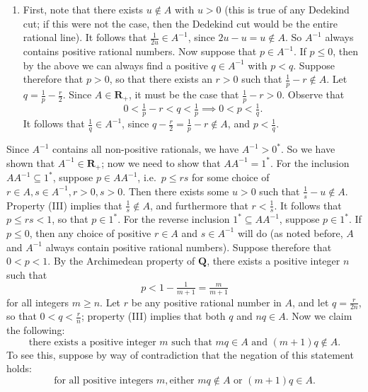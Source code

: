 \documentclass[12pt]{article}
\newcommand{\Q}{\mathbf{Q}}
\newcommand{\R}{\mathbf{R}}
\theoremstyle{definition}
\begin{document}
\begin{enumerate}[label = (M\arabic*)]
\begin{enumerate}[label = (\Roman*)]
        \item First, note that there exists \( u \not\in A \) with \( u > 0 \) (this is true of any Dedekind cut; if this were not the case, then the Dedekind cut would be the entire rational line). It follows that \( \tfrac{1}{2u} \in A^{-1} \), since \( 2u - u = u \not\in A \). So \( A^{-1} \) always contains positive rational numbers. Now suppose that \( p \in A^{-1} \). If \( p \leq 0 \), then by the above we can always find a positive \( q \in A^{-1} \) with \( p < q \). Suppose therefore that \( p > 0 \), so that there exists an \( r > 0 \) such that \( \tfrac{1}{p} - r \not\in A \). Let \( q = \tfrac{1}{p} - \tfrac{r}{2} \). Since \( A \in \R_+ \), it must be the case that \( \tfrac{1}{p} - r > 0 \). Observe that
        \[
            0 < \tfrac{1}{p} - r < q < \tfrac{1}{p} \implies 0 < p < \tfrac{1}{q}.
        \]
        It follows that \( \tfrac{1}{q} \in A^{-1} \), since \( q - \tfrac{r}{2} = \tfrac{1}{p} - r \not\in A \), and \( p < \tfrac{1}{q} \).
    \end{enumerate}
    Since \( A^{-1} \) contains all non-positive rationals, we have \( A^{-1} > 0^* \). So we have shown that \( A^{-1} \in \R_+ \); now we need to show that \( AA^{-1} = 1^* \). For the inclusion \( AA^{-1} \subseteq 1^* \), suppose \( p \in AA^{-1} \), i.e.\ \( p \leq rs \) for some choice of \( r \in A, s \in A^{-1}, r > 0, s > 0 \). Then there exists some \( u > 0 \) such that \( \tfrac{1}{s} - u \not\in A \). Property (III) implies that \( \tfrac{1}{s} \not\in A \), and furthermore that \( r < \tfrac{1}{s} \). It follows that \( p \leq rs < 1 \), so that \( p \in 1^* \). For the reverse inclusion \( 1^* \subseteq AA^{-1} \), suppose \( p \in 1^* \). If \( p \leq 0 \), then any choice of positive \( r \in A \) and \( s \in A^{-1} \) will do (as noted before, \( A \) and \( A^{-1} \) always contain positive rational numbers). Suppose therefore that \( 0 < p < 1 \). By the Archimedean property of \( \Q \), there exists a positive integer \( n \) such that
    \[
        p < 1 - \tfrac{1}{m+1} = \tfrac{m}{m+1} \tag{\(*\)}
    \]
    for all integers \( m \geq n \). Let \( r \) be any positive rational number in \( A \), and let \( q = \tfrac{r}{2n} \), so that \( 0 < q < \tfrac{r}{n} \); property (III) implies that both \( q \) and \( nq \in A \). Now we claim the following:
    \[
        \text{there exists a positive integer } m \text{ such that } mq \in A \text{ and } (m+1)q \not\in A.
    \]
    To see this, suppose by way of contradiction that the negation of this statement holds:
    \[
        \text{for all positive integers } m, \text{either }  mq \not\in A \text{ or } (m+1)q \in A.
\]
\end{enumerate}
\end{document}
